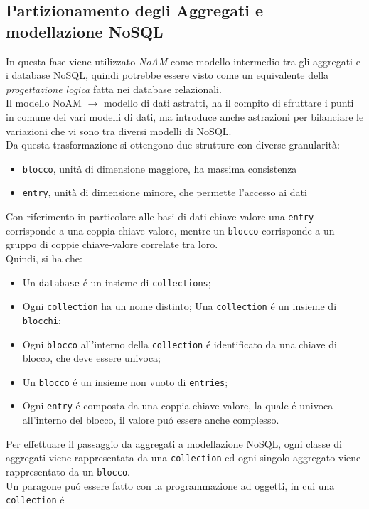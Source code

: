 \subsection{Partizionamento degli Aggregati e modellazione NoSQL}
In questa fase viene utilizzato \emph{NoAM} come modello intermedio tra gli aggregati e i database NoSQL, quindi potrebbe
essere visto come un equivalente della \emph{progettazione logica} fatta nei database relazionali.\\
Il modello NoAM $\to$ modello di dati astratti, ha il compito di sfruttare i punti in comune dei vari modelli di dati, ma
introduce anche astrazioni per bilanciare le variazioni che vi sono tra diversi modelli di NoSQL.\\
Da questa trasformazione si ottengono due strutture con diverse granularità:\\
\begin{itemize}
    \item \texttt{blocco}, unità di dimensione maggiore, ha massima consistenza
    \item \texttt{entry}, unità di dimensione minore, che permette l'accesso ai dati
\end{itemize}
Con riferimento in particolare alle basi di dati chiave-valore una \texttt{entry} corrisponde a una coppia chiave-valore, mentre
un \texttt{blocco} corrisponde a un gruppo di coppie chiave-valore correlate tra loro.\\
Quindi, si ha che:
\begin{itemize}
    \item Un \texttt{database} é un insieme di \texttt{collections};
    \item Ogni \texttt{collection} ha un nome distinto; Una \texttt{collection} é un insieme di \texttt{blocchi};
    \item Ogni \texttt{blocco} all'interno della \texttt{collection} é identificato da una chiave di blocco, che deve essere univoca;
    \item Un \texttt{blocco} é un insieme non vuoto di \texttt{entries};
    \item Ogni \texttt{entry} é composta da una coppia chiave-valore, la quale é univoca all'interno del blocco, il valore puó essere anche complesso.
\end{itemize}
Per effettuare il passaggio da aggregati a modellazione NoSQL, ogni classe di aggregati viene rappresentata da una \texttt{collection} ed
ogni singolo aggregato viene rappresentato da un \texttt{blocco}.\\
Un paragone puó essere fatto con la programmazione ad oggetti, in cui una \texttt{collection} é
